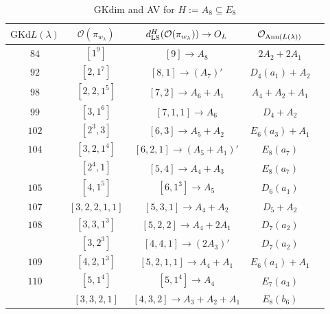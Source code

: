 \documentclass[reqno,12pt]{amsart}
\numberwithin{equation}{section}
\theoremstyle{plain}
\theoremstyle{definition}
\newcommand{\lam}{\lambda}
\renewcommand{\subset}{\subseteq}
\begin{document}
\begin{table}[htbp]\caption{ GKdim and AV for $H:=A_8\subset E_8$}
	\label{taba8}
	\centering
	\renewcommand{\arraystretch}{1.5}
	\setlength\tabcolsep{5pt}
	
	\begin{tabular}{|c|c|c|c|c|}
		\hline $\mathrm{GKd} L(\lambda)$ &     $\mathcal{O}({\pi_{w_{\lam}}})$& $d_{\rm LS}^{H}(\mathcal{O}(\pi_{w_\lambda}))\rightarrow    O_{L}$ & $\mathcal{O}_{{\rm Ann}(L(\lambda))}$ \\ \hline
		 $ 84$    &  $ [1^9]$  &  $ [9]\rightarrow A_8$     &   $ 2A_2+2A_1$      \\ \hline
	 $ 92 $    &  $ [2,1^7]$  &  $ [8,1]\rightarrow (A_7)'$     &   $ D_4(a_1)+A_2$      \\ 
 \hline	
  
  $ 98$    &  $ [2,2,1^5]$  &$[7,2]\rightarrow      A_6+A_1 $  &   $A_4+A_2+A_1 $        \\ \hline

$ 99$    &  $ [3, 1^6]$  &$[7,1,1]\rightarrow      A_6 $  &   $D_4+A_2 $        \\ \hline
$ 102$    &  $ [2^3, 3]$  &$[6,3]\rightarrow      A_5+A_2 $  &   $E_6(a_3)+A_1 $        \\ \hline
$ 104$    &  $ [3,2,1^4]$  &$[6,2,1]\rightarrow      (A_5+A_1)' $  &   $E_8(a_7) $        \\ 
   &  $ [2^4,1]$  &$[5,4]\rightarrow      A_4+A_3 $  &   $E_8(a_7) $        \\ \hline

  $ 105$    &  $ [4, 1^5]$  &$[6,1^3]\rightarrow      A_5 $  &   $D_6(a_1)$        \\ \hline
$ 107$    &  $ [3,2,2, 1,1]$  &$[5,3,1]\rightarrow      A_4+A_2 $  &   $D_5+A_2$        \\ \hline
$ 108$    &  $ [3,3,1^3]$  &$[5,2,2]\rightarrow      A_4+2A_1 $  &   $D_7(a_2) $        \\ 
   &  $ [3,2^3]$  &$[4,4,1]\rightarrow      (2A_3)' $  &   $D_7(a_2) $        \\ 
  \hline
$ 109$    &  $ [4, 2, 1^3]$  &$[5,2,1,1]\rightarrow      A_4+A_1 $  &   $E_6(a_1)+A_1$        \\ \hline

$ 110$    &  $ [5,1^4]$  &$[5,1^4]\rightarrow      A_4 $  &   $E_7(a_3) $        \\ 
   &  $ [3,3,2,1]$  &$[4,3,2]\rightarrow      A_3+A_2+A_1 $  &   $E_8(b_6) $        \\ \hline


\end{tabular}
\end{table}
\end{document}

